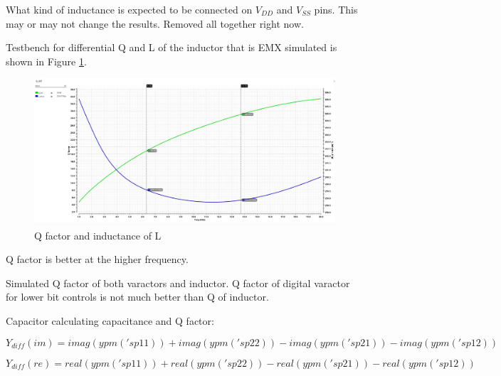 
\begin{question}
	What kind of inductance is expected to be connected on $V_{DD}$ and $V_{SS}$ pins. This may or may not change the results. Removed all together right now.
\end{question}

Testbench for differential Q and L of the inductor that is EMX simulated is shown in Figure \ref{fig:qlinductor}.

\begin{figure}[ht!]
	\includegraphics[width=\linewidth]{Figures/QL_inductor.png}
	\caption{Q factor and inductance of L}
	\label{fig:qlinductor}
\end{figure}

Q factor is better at the higher frequency.

Simulated Q factor of both varactors and inductor. Q factor of digital varactor for lower bit controls is not much better than Q of inductor.



Capacitor calculating capacitance and Q factor:

\begin{equation}
	Y_{diff} (im) = imag(ypm('sp 1 1)) + imag(ypm('sp 2 2)) - imag(ypm('sp 2 1)) - imag(ypm('sp 1 2))
\end{equation}

\begin{equation}
	Y_{diff} (re) = real(ypm('sp 1 1)) + real(ypm('sp 2 2)) - real(ypm('sp 2 1)) - real(ypm('sp 1 2))
\end{equation}

